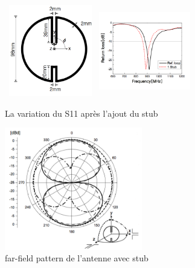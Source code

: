 \documentclass[11pt, a4paper, twoside]{book}
\begin{document}
\begin{figure}[H]
\centering
\includegraphics[width=4cm, height=4cm]{stuba}
\includegraphics[width=4cm, height=4cm]{stubb}
\caption{La variation du S11 après l'ajout du stub}
\end{figure}

\begin{figure}[H]
\centering
\includegraphics[width=6cm]{lob}
\caption{far-field pattern de l'antenne avec stub}
\end{figure}
\end{document}
